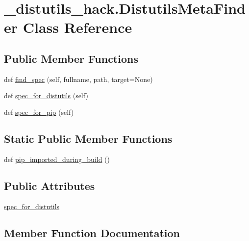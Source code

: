 \hypertarget{class__distutils__hack_1_1DistutilsMetaFinder}{}\section{\+\_\+distutils\+\_\+hack.\+Distutils\+Meta\+Finder Class Reference}
\label{class__distutils__hack_1_1DistutilsMetaFinder}
\subsection*{Public Member Functions}
\begin{DoxyCompactItemize}
\item 
def \hyperlink{class__distutils__hack_1_1DistutilsMetaFinder_ae5795c5ef59bc42ffcd9058cc422d07a}{find\+\_\+spec} (self, fullname, path, target=None)
\item 
def \hyperlink{class__distutils__hack_1_1DistutilsMetaFinder_ae2ac8bea7dc268c9de8d9e9478514a76}{spec\+\_\+for\+\_\+distutils} (self)
\item 
def \hyperlink{class__distutils__hack_1_1DistutilsMetaFinder_aa927b4354bae3844b6ec79b0bf57eb6b}{spec\+\_\+for\+\_\+pip} (self)
\end{DoxyCompactItemize}
\subsection*{Static Public Member Functions}
\begin{DoxyCompactItemize}
\item 
def \hyperlink{class__distutils__hack_1_1DistutilsMetaFinder_a6b2f328bda23b4dd2591746f43316205}{pip\+\_\+imported\+\_\+during\+\_\+build} ()
\end{DoxyCompactItemize}
\subsection*{Public Attributes}
\begin{DoxyCompactItemize}
\item 
\hyperlink{class__distutils__hack_1_1DistutilsMetaFinder_a3662bcc0652c31ad82ae1b55212dfb65}{spec\+\_\+for\+\_\+distutils}
\end{DoxyCompactItemize}


\subsection{Member Function Documentation}
\mbox{\label{class__distutils__hack_1_1DistutilsMetaFinder_ae5795c5ef59bc42ffcd9058cc422d07a}} 
